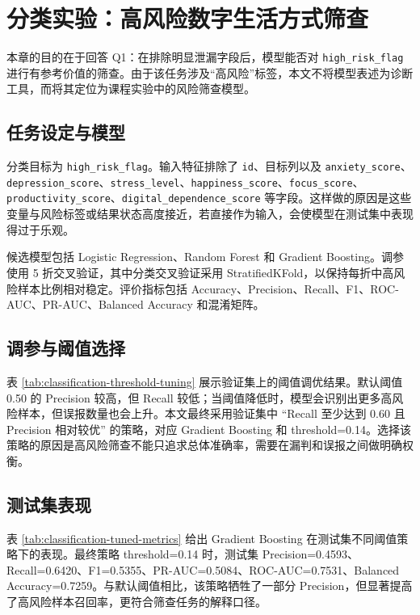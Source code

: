 \section{分类实验：高风险数字生活方式筛查}

本章的目的在于回答 Q1：在排除明显泄漏字段后，模型能否对 \texttt{high\_risk\_flag} 进行有参考价值的筛查。由于该任务涉及“高风险”标签，本文不将模型表述为诊断工具，而将其定位为课程实验中的风险筛查模型。

\subsection{任务设定与模型}

分类目标为 \texttt{high\_risk\_flag}。输入特征排除了 \texttt{id}、目标列以及 \texttt{anxiety\_score}、\texttt{depression\_score}、\texttt{stress\_level}、\texttt{happiness\_score}、\texttt{focus\_score}、\texttt{productivity\_score}、\texttt{digital\_dependence\_score} 等字段。这样做的原因是这些变量与风险标签或结果状态高度接近，若直接作为输入，会使模型在测试集中表现得过于乐观。

候选模型包括 Logistic Regression、Random Forest 和 Gradient Boosting。调参使用 5 折交叉验证，其中分类交叉验证采用 StratifiedKFold，以保持每折中高风险样本比例相对稳定。评价指标包括 Accuracy、Precision、Recall、F1、ROC-AUC、PR-AUC、Balanced Accuracy 和混淆矩阵。

\subsection{调参与阈值选择}

表 \ref{tab:classification-threshold-tuning} 展示验证集上的阈值调优结果。默认阈值 0.50 的 Precision 较高，但 Recall 较低；当阈值降低时，模型会识别出更多高风险样本，但误报数量也会上升。本文最终采用验证集中 “Recall 至少达到 0.60 且 Precision 相对较优” 的策略，对应 Gradient Boosting 和 threshold=0.14。选择该策略的原因是高风险筛查不能只追求总体准确率，需要在漏判和误报之间做明确权衡。



\subsection{测试集表现}

表 \ref{tab:classification-tuned-metrics} 给出 Gradient Boosting 在测试集不同阈值策略下的表现。最终策略 threshold=0.14 时，测试集 Precision=0.4593、Recall=0.6420、F1=0.5355、PR-AUC=0.5084、ROC-AUC=0.7531、Balanced Accuracy=0.7259。与默认阈值相比，该策略牺牲了一部分 Precision，但显著提高了高风险样本召回率，更符合筛查任务的解释口径。

